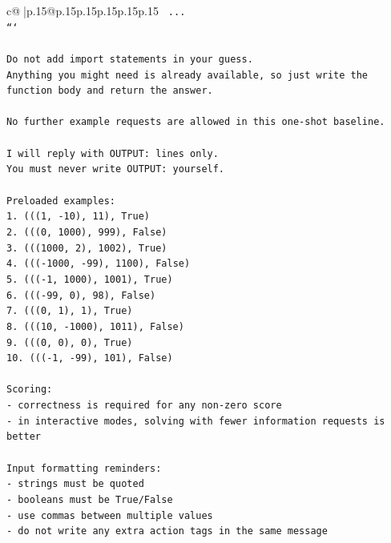 \documentclass{article}
\begin{document}
{\begin{supertabular}{c@{$\;$}|p{.15\linewidth}@{}p{.15\linewidth}p{.15\linewidth}p{.15\linewidth}p{.15\linewidth}p{.15\linewidth}}
{{{\texttt{    ...} \\
\texttt{```} \\
\\ 
\texttt{Do not add import statements in your guess.} \\
\texttt{Anything you might need is already available, so just write the function body and return the answer.} \\
\\ 
\texttt{No further example requests are allowed in this one{-}shot baseline.} \\
\\ 
\texttt{I will reply with OUTPUT: lines only.} \\
\texttt{You must never write OUTPUT: yourself.} \\
\\ 
\texttt{Preloaded examples:} \\
\texttt{1. (((1, {-}10), 11), True)} \\
\texttt{2. (((0, 1000), 999), False)} \\
\texttt{3. (((1000, 2), 1002), True)} \\
\texttt{4. ((({-}1000, {-}99), 1100), False)} \\
\texttt{5. ((({-}1, 1000), 1001), True)} \\
\texttt{6. ((({-}99, 0), 98), False)} \\
\texttt{7. (((0, 1), 1), True)} \\
\texttt{8. (((10, {-}1000), 1011), False)} \\
\texttt{9. (((0, 0), 0), True)} \\
\texttt{10. ((({-}1, {-}99), 101), False)} \\
\\ 
\texttt{Scoring:} \\
\texttt{{-} correctness is required for any non{-}zero score} \\
\texttt{{-} in interactive modes, solving with fewer information requests is better} \\
\\ 
\texttt{Input formatting reminders:} \\
\texttt{{-} strings must be quoted} \\
\texttt{{-} booleans must be True/False} \\
\texttt{{-} use commas between multiple values} \\
\texttt{{-} do not write any extra action tags in the same message} \\
\\ 
}}}
\end{supertabular}}
\end{document}
